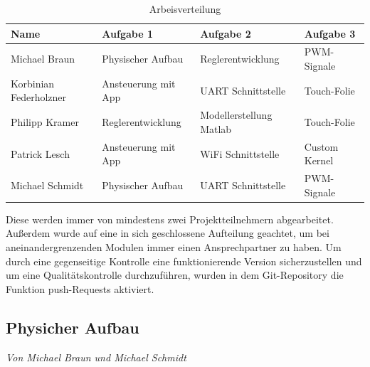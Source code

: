 \documentclass[12pt,a4paper,bibliography=totoc,listof=totoc]{scrartcl}
\begin{document}
\begin{table}[]
\centering
\begin{tabular}{|l|l|l|l|}
\hline
Name 					& Aufgabe 1 			& Aufgabe 2 				& Aufgabe 3  \\
\hline
Michael Braun			& Physischer Aufbau		& Reglerentwicklung			& PWM-Signale \\
\hline
Korbinian Federholzner	& Ansteuerung mit App	& UART Schnittstelle		& Touch-Folie \\
\hline
Philipp Kramer			&Reglerentwicklung		& Modellerstellung Matlab	& Touch-Folie\\
\hline
Patrick Lesch			& Ansteuerung mit App	& WiFi Schnittstelle		& Custom Kernel\\
\hline
Michael Schmidt			& Physischer Aufbau		& UART Schnittstelle		& PWM-Signale\\
\hline
\end{tabular}
\label{tab:Arbeisverteilung}
\caption{Arbeisverteilung}
\end{table}

Diese werden immer von mindestens zwei Projektteilnehmern abgearbeitet. Außerdem wurde auf eine in sich 
geschlossene Aufteilung geachtet, um bei aneinandergrenzenden Modulen immer einen Ansprechpartner zu haben. 
Um durch eine gegenseitige Kontrolle eine funktionierende Version sicherzustellen und um eine 
Qualitätskontrolle durchzuführen, wurden in dem Git-Repository die Funktion push-Requests aktiviert.
\pagebreak
\subsection{Physicher Aufbau}
\textit{Von Michael Braun und Michael Schmidt}\newline
\end{document}
